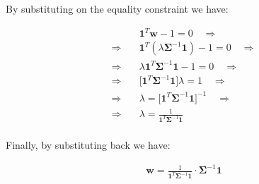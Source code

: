 \documentclass{beamer}
\begin{document}
\begin{frame}

\justifying
By substituting on the equality constraint we have:

\justifying
\begin{equation*}
\begin{aligned}
	& \mathbf{1}^{T}\mathbf{w} - 1 = 0 \quad \Rightarrow \\
	\Rightarrow \quad & \mathbf{1}^{T} \left(\lambda \mathbf{\Sigma}^{-1}\mathbf{1}\right) - 1 = 0 \quad \Rightarrow \\
	\Rightarrow \quad & \lambda \mathbf{1}^{T} \mathbf{\Sigma}^{-1}\mathbf{1} - 1 = 0 \quad \Rightarrow \\
	\Rightarrow \quad & \Bigr[\mathbf{1}^{T} \mathbf{\Sigma}^{-1}\mathbf{1}\Bigr]\lambda = 1 \quad \Rightarrow \\
	\Rightarrow \quad & \lambda = \Bigr[\mathbf{1}^{T} \mathbf{\Sigma}^{-1}\mathbf{1}\Bigr]^{-1} \quad \Rightarrow \\
	\Rightarrow \quad & \lambda = \frac{1}{\mathbf{1}^{T} \mathbf{\Sigma}^{-1}\mathbf{1}} \\
\end{aligned}
\end{equation*}

\vspace{0.2cm}
\justifying
Finally, by substituting back we have:

\justifying
\begin{equation*}
\begin{aligned}
	\mathbf{w} = \frac{1}{\mathbf{1}^{T} \mathbf{\Sigma}^{-1}\mathbf{1}} \cdot \mathbf{\Sigma}^{-1}\mathbf{1}
\end{aligned}
\end{equation*}

\end{frame}
\end{document}
